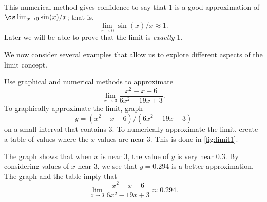 This numerical method gives confidence to say that 1 is a good approximation of $\ds\lim_{x\to 0} \sin(x)/x$; that is,\vspace{-.3\baselineskip}
\[\lim_{x\to 0} \sin(x)/x \approx 1.\]
Later we will be able to prove that the limit is \emph{exactly} 1.


We now consider several examples that allow us to explore different aspects of the limit concept.

\begin{example}\label{ex_limit1}%
Use graphical and numerical methods to approximate
\[\lim_{x\to 3} \frac{x^2-x-6}{6x^2-19x+3}.\]
\solution
To graphically approximate the limit, graph
\[y = (x^2-x-6)/(6x^2-19x+3)\]
on a small interval that contains 3. To numerically approximate the limit, create a table of values where the $x$ values are near 3. This is done in \autoref{fig:limit1}.


The graph shows that when $x$ is near 3, the value of $y$ is very near $0.3$. By considering values of $x$ near 3, we see that $y=0.294$ is a better approximation. The graph and the table imply that
\[\lim_{x\to 3} \frac{x^2-x-6}{6x^2-19x+3} \approx 0.294.\]
\end{example}

